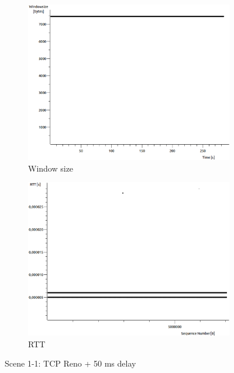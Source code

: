 \documentclass[conference,a4paper]{../../sty/IEEEtran}
\begin{document}
\begin{figure}
\begin{subfigure}[b]{0.2\textwidth}
  \includegraphics[width=\textwidth]{s1-1_wnd}
  \caption{Window size}
 \end{subfigure}
 \begin{subfigure}[b]{0.2\textwidth}
  \includegraphics[width=\textwidth]{s1-1_rtt}
  \caption{RTT}
 \end{subfigure}
 \caption{Scene 1-1: TCP Reno + 50 ms delay}
\end{figure}
\end{document}
